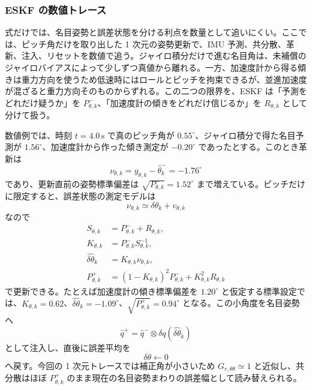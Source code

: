 \subsubsection{ESKF の数値トレース}

式だけでは、名目姿勢と誤差状態を分ける利点を数量として追いにくい。ここでは、ピッチ角だけを取り出した 1 次元の姿勢更新で、IMU 予測、共分散、革新、注入、リセットを数値で追う。ジャイロ積分だけで進む名目角は、未補償のジャイロバイアスによって少しずつ真値から離れる。一方、加速度計から得る傾きは重力方向を使うため低速時にはロールとピッチを拘束できるが、並進加速度が混ざると重力方向そのものからずれる。この二つの限界を、ESKF は「予測をどれだけ疑うか」を $P^-_{\theta,k}$、「加速度計の傾きをどれだけ信じるか」を $R_{\theta,k}$ として分けて扱う。

数値例では、時刻 $t=4.0\,\mathrm{s}$ で真のピッチ角が $0.55^\circ$、ジャイロ積分で得た名目予測が $1.56^\circ$、加速度計から作った傾き測定が $-0.20^\circ$ であったとする。このとき革新は
\begin{equation}
  \nu_{\theta,k}
  =
  y_{\theta,k}-\hat{\theta}^{-}_k
  =
  -1.76^\circ
\end{equation}
であり、更新直前の姿勢標準偏差は $\sqrt{P^-_{\theta,k}}=1.52^\circ$ まで増えている。ピッチだけに限定すると、誤差状態の測定モデルは
\begin{equation}
  \nu_{\theta,k}
  \simeq
  \delta\theta_k+v_{\theta,k}
\end{equation}
なので
\begin{align}
  S_{\theta,k}&=P^-_{\theta,k}+R_{\theta,k},\\
  K_{\theta,k}&=P^-_{\theta,k}S_{\theta,k}^{-1},\\
  \widehat{\delta\theta}_k&=K_{\theta,k}\nu_{\theta,k},\\
  P^+_{\theta,k}
  &=(1-K_{\theta,k})^2P^-_{\theta,k}
    +K_{\theta,k}^2R_{\theta,k}
\end{align}
で更新できる。たとえば加速度計の傾き標準偏差を $1.20^\circ$ と仮定する標準設定では、$K_{\theta,k}=0.62$、$\widehat{\delta\theta}_k=-1.09^\circ$、$\sqrt{P^+_{\theta,k}}=0.94^\circ$ となる。この小角度を名目姿勢へ
\begin{equation}
  \hat{q}^{+}
  =
  \hat{q}^{-}\otimes\delta q(\widehat{\delta\theta}_k)
\end{equation}
として注入し、直後に誤差平均を
\begin{equation}
  \delta\theta\leftarrow0
\end{equation}
へ戻す。今回の 1 次元トレースでは補正角が小さいため $G_{r,\theta\theta}\simeq1$ と近似し、共分散はほぼ $P^+_{\theta,k}$ のまま現在の名目姿勢まわりの誤差幅として読み替えられる。

